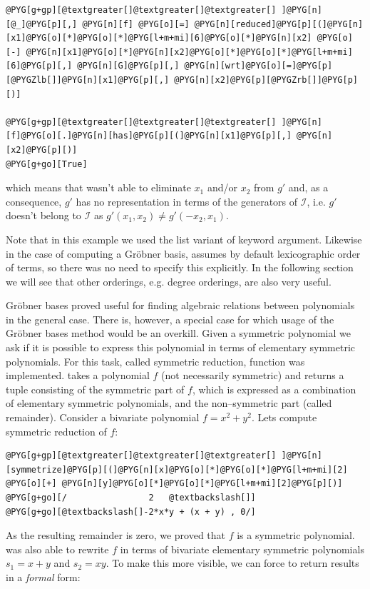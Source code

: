 \begin{Verbatim}[commandchars=@\[\]]
@PYG[g+gp][@textgreater[]@textgreater[]@textgreater[] ]@PYG[n][@_]@PYG[p][,] @PYG[n][f] @PYG[o][=] @PYG[n][reduced]@PYG[p][(]@PYG[n][x1]@PYG[o][*]@PYG[o][*]@PYG[l+m+mi][6]@PYG[o][*]@PYG[n][x2] @PYG[o][-] @PYG[n][x1]@PYG[o][*]@PYG[n][x2]@PYG[o][*]@PYG[o][*]@PYG[l+m+mi][6]@PYG[p][,] @PYG[n][G]@PYG[p][,] @PYG[n][wrt]@PYG[o][=]@PYG[p][@PYGZlb[]]@PYG[n][x1]@PYG[p][,] @PYG[n][x2]@PYG[p][@PYGZrb[]]@PYG[p][)]

@PYG[g+gp][@textgreater[]@textgreater[]@textgreater[] ]@PYG[n][f]@PYG[o][.]@PYG[n][has]@PYG[p][(]@PYG[n][x1]@PYG[p][,] @PYG[n][x2]@PYG[p][)]
@PYG[g+go][True]
\end{Verbatim}
\noindent
which means that  wasn't able to eliminate $x_1$ and/or $x_2$ from $g'$ and,
as a consequence, $g'$ has no representation in terms of the generators of $\mathcal{I}$,
i.e. $g'$ doesn't belong to $\mathcal{I}$ as $g'(x_1, x_2) \not= g'(-x_2, x_1)$.

Note that in this example we used the list variant of  keyword argument. Likewise in the
case of computing a Gröbner basis,  assumes by default lexicographic order of
terms, so there was no need to specify this explicitly. In the following section we will see that
other orderings, e.g. degree orderings, are also very useful.

Gröbner bases proved useful for finding algebraic relations between polynomials in the general
case. There is, however, a special case for which usage of the Gröbner bases method would be an
overkill. Given a symmetric polynomial we ask if it is possible to express this polynomial in terms
of elementary symmetric polynomials. For this task, called symmetric reduction, 
function was implemented.  takes a polynomial $f$ (not necessarily symmetric) and
returns a tuple consisting of the symmetric part of $f$, which is expressed as a combination of
elementary symmetric polynomials, and the non--symmetric part (called remainder). Consider a
bivariate polynomial $f = x^2 + y^2$. Lets compute symmetric reduction of $f$:

\begin{Verbatim}[commandchars=@\[\]]
@PYG[g+gp][@textgreater[]@textgreater[]@textgreater[] ]@PYG[n][symmetrize]@PYG[p][(]@PYG[n][x]@PYG[o][*]@PYG[o][*]@PYG[l+m+mi][2] @PYG[o][+] @PYG[n][y]@PYG[o][*]@PYG[o][*]@PYG[l+m+mi][2]@PYG[p][)]
@PYG[g+go][/                2   @textbackslash[]]
@PYG[g+go][@textbackslash[]-2*x*y + (x + y) , 0/]
\end{Verbatim}
\noindent
As the resulting remainder is zero, we proved that $f$ is a symmetric polynomial. 
was also able to rewrite $f$ in terms of bivariate elementary symmetric polynomials $s_1 = x + y$ and
$s_2 = x y$. To make this more visible, we can force  to return results in a \emph{formal}
form:

